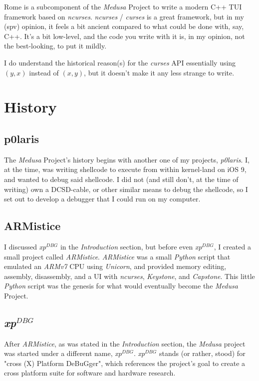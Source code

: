 \documentclass{report}
\newcommand{\xpDBG}{\textit{xp$^{DBG}$}\xspace}
\begin{document}
	Rome is a subcomponent of the \textit{Medusa} Project to write a modern C++
	TUI framework based on \textit{ncurses}. \textit{ncurses} / \textit{curses}
	is a great framework, but in my (spv) opinion, it feels a bit ancient
	compared to what could be done with, say, C++. It's a bit low-level, and the
	code you write with it is, in my opinion, not the best-looking, to put it
	mildly.

	I do understand the historical reason(s) for the \textit{curses} API
	essentially using $(y,x)$ instead of $(x,y)$, but it doesn't make it any
	less strange to write.

	\chapter{History}
	\section{p0laris}
	The \textit{Medusa} Project's history begins with another one of my
	projects, \textit{p0laris}. I, at the time, was writing shellcode to execute
	from within kernel-land on iOS 9, and wanted to debug said shellcode. I did
	not (and still don't, at the time of writing) own a DCSD-cable, or other
	similar means to debug the shellcode, so I set out to develop a debugger
	that I could run on my computer.

	\section{ARMistice}
	I discussed \xpDBG in the \textit{Introduction} section, but before even
	\xpDBG, I created a small project called \textit{ARMistice}.
	\textit{ARMistice} was a small \textit{Python} script that emulated an
	\textit{ARMv7} CPU using \textit{Unicorn}, and provided memory editing,
	assembly, disassembly, and a UI with \textit{ncurses}, \textit{Keystone},
	and \textit{Capstone}. This little \textit{Python} script was the genesis
	for what would eventually become the \textit{Medusa} Project.

	\section{\xpDBG}
	After \textit{ARMistice}, as was stated in the \textit{Introduction}
	section, the \textit{Medusa} project was started under a different name,
	\xpDBG. \xpDBG stands (or rather, stood) for "cross (X) Platform
	DeBuGger", which references the project's goal to create a cross platform
	suite for software and hardware research. 
\end{document}
